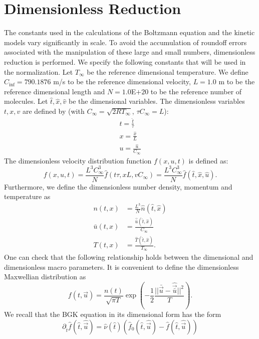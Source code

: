 \section{Dimensionless Reduction}
The constants used in the calculations of the Boltzmann equation and the kinetic models vary significantly in scale. To avoid the accumulation of roundoff errors associated with the manipulation of these large and small numbers, dimensionless reduction is performed. We specify the following constants that will be used in the normalization. Let $T_{\infty}$ be the reference dimensional temperature. We define $C_{\inf}=790.1876$ m/s to be the reference dimensional velocity, $L = 1.0$ m to be the reference dimensional length and $N = 1.0$E$+20$ to be the reference number of molecules. Let $\hat{t},\hat{x},\hat{v}$ be the dimensional variables. The dimensionless variables $t,x,v$ are defined by (with $C_\infty = \sqrt{2 R T_\infty}, \, \tau C_\infty = L $):
%
\begin{align*}
t = \frac{\hat{t}}{\tau}\\
x = \frac{\hat{x}}{L}\\
u = \frac{\hat{u}}{C_\infty}
\end{align*}
%
The dimensionless velocity distribution function $f(x,u,t)$ is defined as:
%
\begin{equation*}
f(x,u,t) = \frac{L^3 C_\infty^3}{N} \hat{f}(t \tau, x L, v C_\infty) = \frac{L^3 C_\infty^3}{N} \hat{f} (\hat{t}, \hat{x}, \hat{u}).
\end{equation*}
%
Furthermore, we define the dimensionless number density, momentum and temperature as
%
\begin{align}
\label{npart}
n(t,x) &= \frac{L^3}{N} \hat{n} (\hat{t}, \hat{x})\\
\label{upart}
\bar{u} (t,x) &= \frac{\hat{\bar{u}} (\hat{t},\hat{x})}{C_\infty}\\
\label{tpart}
T(t,x) &= \frac{\hat{T}(\hat{t}, \hat{x})}{T_\infty}.
\end{align}
%
One can check that the following relationship holds between the dimensional and dimensionless macro parameters.
%
It is convenient to define the dimensionless Maxwellian distribution as
%
\begin{equation*}
f(t, \vec{u}) = \frac{n(t)}{\sqrt{\pi T}} \exp \left(-\frac{1}{2}  \frac{||\bar{\vec{u}} - \hat{\vec{\bar{u}}}||^2}{T} \right).
\end{equation*}
%
We recall that the BGK equation in its dimensional form has the form
%
\begin{equation}
\label{The}
\partial_{\hat{t}} \hat{f}(\hat{t}, \hat{\vec{u}}) = \hat{\nu}(\hat{t})\left(\hat{f}_{0}(\hat{t}, \hat{\vec{u}})- \hat{f}(\hat{t}, \hat{\vec{u}})\right)
\end{equation}
